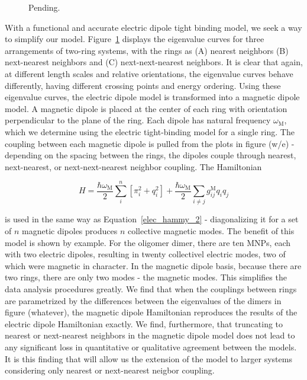 \documentclass[journal=apchd5,manuscript=article]{achemso}
\begin{document}
\begin{figure}
\begin{center}
\caption{Pending.}
\label{ring_spacing}
\end{center}
\end{figure}

With a functional and accurate electric dipole tight binding model, we seek a way to simplify our model. Figure~\ref{ring_spacing} displays the eigenvalue curves for three arrangements of two-ring systems, with the rings as (A) nearest neighbors (B) next-nearest neighbors and (C) next-next-nearest neighbors. It is clear that again, at different length scales and relative orientations, the eigenvalue curves behave differently, having different crossing points and energy ordering. Using these eigenvalue curves, the electric dipole model is transformed into a magnetic dipole model. A magnetic dipole is placed at the center of each ring with orientation perpendicular to the plane of the ring. Each dipole has natural frequency $\omega_{\textrm{M}}$, which we determine using the electric tight-binding model for a single ring. The coupling between each magnetic dipole is pulled from the plots in figure (w/e) - depending on the spacing between the rings, the dipoles couple through nearest, next-nearest, or next-next-nearest neighbor coupling. The Hamiltonian

\begin{equation}
H = \frac{\hbar\omega_{\textrm{M}}}{2}\sum_{i}^{n}[\pi_{i}^{2}+q_{i}^{2}]+\frac{\hbar\omega_{\textrm{M}}}{2}\sum_{i\neq j}g_{ij}^{\textrm{M}}q_{i}q_{j}
\label{mag_hammy}
\end{equation}

is used in the same way as Equation~\ref{elec_hammy_2} - diagonalizing it for a set of $n$ magnetic dipoles produces $n$ collective magnetic modes. The benefit of this model is shown by example. For the oligomer dimer, there are ten MNPs, each with two electric dipoles, resulting in twenty collectivel electric modes, two of which were magnetic in character. In the magnetic dipole basis, because there are two rings, there are only two modes - the magnetic modes. This simplifies the data analysis procedures greatly. We find that when the couplings between rings are parametrized by the differences between the eigenvalues of the dimers in figure (whatever), the magnetic dipole Hamiltonian reproduces the results of the electric dipole Hamiltonian exactly. We find, furthermore, that truncating to nearest or next-nearest neighbors in the magnetic dipole model does not lead to any significant loss in quantitative or qualitative agreement between the models. It is this finding that will allow us the extension of the model to larger systems considering only nearest or next-nearest neigbor coupling.
\end{document}

